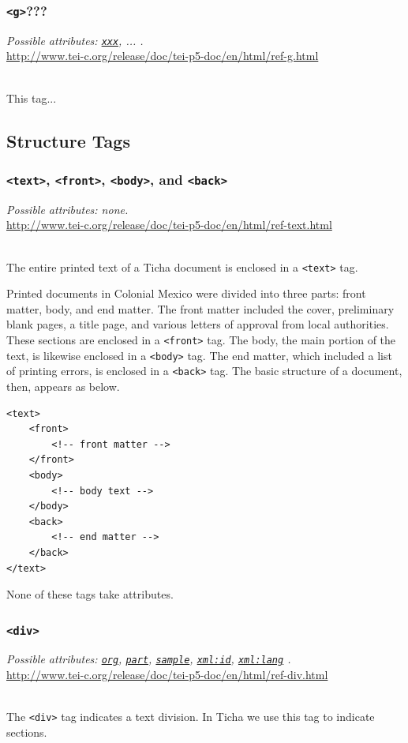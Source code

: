 \documentclass[12pt,a4paper]{article}
\newcommand{\taglinks}[2]{
\vspace*{-0.5ex}
\hspace*{\parindent}
\begin{minipage}{\textwidth}
  \emph{Possible attributes: #1.} \\ \url{#2} \end{minipage} \vspace{0.5ex} \\ }
\begin{document}
\subsubsection{\texttt{<g>}???} \label{tag-sec:g}
\taglinks{
\hyperref[att-sec:xxx]{\texttt{xxx}}, ... }
{http://www.tei-c.org/release/doc/tei-p5-doc/en/html/ref-g.html}
This tag...

\subsection{Structure Tags}

\subsubsection{\texttt{<text>}, \texttt{<front>}, \texttt{<body>}, and \texttt{<back>}} \label{tag-sec:frontbodyback}

\taglinks{none}{http://www.tei-c.org/release/doc/tei-p5-doc/en/html/ref-text.html}
The entire printed text of a Ticha document is enclosed in a \texttt{<text>} tag.

Printed documents in Colonial Mexico were divided into three parts: front matter, body, and end matter.  The front matter included the cover, preliminary blank pages, a title page, and various letters of approval from local authorities.  These sections are enclosed in a \texttt{<front>} tag.  The body, the main portion of the text, is likewise enclosed in a \texttt{<body>} tag.  The end matter, which included a list of printing errors, is enclosed in a \texttt{<back>} tag.  The basic structure of a document, then, appears as below.

\begin{lstlisting}
<text>
	<front>
		<!-- front matter -->
	</front>
	<body>
		<!-- body text -->
	</body>
	<back>
		<!-- end matter -->
	</back>
</text>
\end{lstlisting}

None of these tags take attributes.

\subsubsection{\texttt{<div>}} \label{tag-sec:div}

\taglinks{
\hyperref[att-sec:org]{\texttt{org}}, 
\hyperref[att-sec:part]{\texttt{part}}, 
\hyperref[att-sec:sample]{\texttt{sample}},  \hyperref[att-sec:xml:id]{\texttt{xml:id}},
\hyperref[att-sec:xml:lang]{\texttt{xml:lang}} 
}
{http://www.tei-c.org/release/doc/tei-p5-doc/en/html/ref-div.html}
%
The \texttt{<div>} tag indicates a text division.  In Ticha we use this tag to indicate sections.
\end{document}

